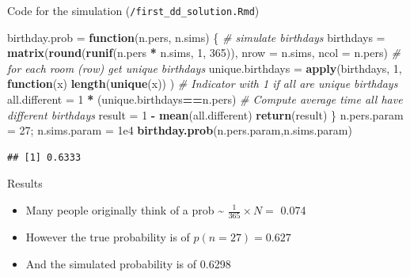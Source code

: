 \documentclass[ignorenonframetext,]{beamer}
\newenvironment{Shaded}{\begin{snugshade}}{\end{snugshade}}
\newcommand{\KeywordTok}[1]{\textcolor[rgb]{0.13,0.29,0.53}{\textbf{#1}}}
\newcommand{\DataTypeTok}[1]{\textcolor[rgb]{0.13,0.29,0.53}{#1}}
\newcommand{\DecValTok}[1]{\textcolor[rgb]{0.00,0.00,0.81}{#1}}
\newcommand{\FloatTok}[1]{\textcolor[rgb]{0.00,0.00,0.81}{#1}}
\newcommand{\StringTok}[1]{\textcolor[rgb]{0.31,0.60,0.02}{#1}}
\newcommand{\CommentTok}[1]{\textcolor[rgb]{0.56,0.35,0.01}{\textit{#1}}}
\newcommand{\ControlFlowTok}[1]{\textcolor[rgb]{0.13,0.29,0.53}{\textbf{#1}}}
\newcommand{\OperatorTok}[1]{\textcolor[rgb]{0.81,0.36,0.00}{\textbf{#1}}}
\newcommand{\NormalTok}[1]{#1}
\providecommand{\tightlist}{%
  \setlength{\itemsep}{0pt}\setlength{\parskip}{0pt}}
\begin{document}
\begin{frame}[fragile]{Code for the simulation
(\texttt{/first\_dd\_solution.Rmd})}

\begin{Shaded}
\begin{Highlighting}[]
\NormalTok{birthday.prob =}\StringTok{ }\ControlFlowTok{function}\NormalTok{(n.pers, n.sims) \{}
  \CommentTok{# simulate birthdays}
\NormalTok{  birthdays =}\StringTok{ }\KeywordTok{matrix}\NormalTok{(}\KeywordTok{round}\NormalTok{(}\KeywordTok{runif}\NormalTok{(n.pers }\OperatorTok{*}\StringTok{ }\NormalTok{n.sims, }
                                 \DecValTok{1}\NormalTok{, }\DecValTok{365}\NormalTok{)), }
                      \DataTypeTok{nrow =}\NormalTok{ n.sims, }\DataTypeTok{ncol =}\NormalTok{ n.pers)}
  \CommentTok{# for each room (row) get unique birthdays}
\NormalTok{  unique.birthdays =}\StringTok{ }\KeywordTok{apply}\NormalTok{(birthdays, }\DecValTok{1}\NormalTok{, }
                           \ControlFlowTok{function}\NormalTok{(x) }
                             \KeywordTok{length}\NormalTok{(}\KeywordTok{unique}\NormalTok{(x)) )}
  \CommentTok{# Indicator with 1 if all are unique birthdays}
\NormalTok{  all.different =}\StringTok{ }\DecValTok{1} \OperatorTok{*}\StringTok{ }\NormalTok{(unique.birthdays}\OperatorTok{==}\NormalTok{n.pers)}
  \CommentTok{# Compute average time all have different birthdays }
\NormalTok{  result =}\StringTok{ }\DecValTok{1} \OperatorTok{-}\StringTok{ }\KeywordTok{mean}\NormalTok{(all.different)}
\KeywordTok{return}\NormalTok{(result)}
\NormalTok{\}}
\NormalTok{n.pers.param =}\StringTok{ }\DecValTok{27}\NormalTok{; n.sims.param =}\StringTok{ }\FloatTok{1e4}
\KeywordTok{birthday.prob}\NormalTok{(n.pers.param,n.sims.param)}
\end{Highlighting}
\end{Shaded}

\begin{verbatim}
## [1] 0.6333
\end{verbatim}

\end{frame}

\begin{frame}{Results}

\begin{itemize}
\tightlist
\item
  Many people originally think of a prob \textasciitilde{}
  \(\frac{1}{365} \times N =\) 0.074
\item
  However the true probability is of \(p(n= 27) = 0.627\)
\item
  And the simulated probability is of 0.6298
\end{itemize}

\end{frame}
\end{document}
